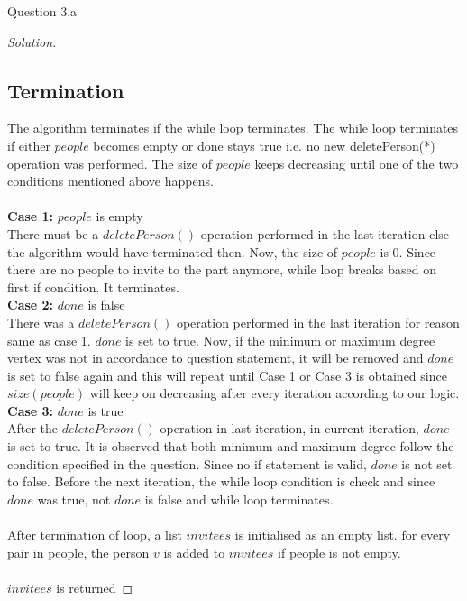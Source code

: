 \begin{solution}{Question 3.a}
\begin{proof}[Solution]
        \subsection*{Termination}
        The algorithm terminates if the while loop terminates. The while loop terminates if either $people$ becomes empty or done stays true i.e. no new deletePerson(*) operation was performed. The size of $people$ keeps decreasing until one of the two conditions mentioned above happens.\\
        \\
        \textbf{Case 1:} $people$ is empty\\
        There must be a $deletePerson()$ operation performed in the last iteration else the algorithm would have terminated then. Now, the size of $people$ is 0. Since there are no people to invite to the part anymore, while loop breaks based on first if condition. It terminates.
        \\
        \textbf{Case 2:} $done$ is false\\
        There was a $deletePerson()$ operation performed in the last iteration for reason same as case 1. $done$ is set to true. Now, if the minimum or maximum degree vertex was not in accordance to question statement, it will be removed and $done$ is set to false again and this will repeat until Case 1 or Case 3 is obtained since $size(people)$ will keep on decreasing after every iteration according to our logic.
        \\
        \textbf{Case 3:} $done$ is true\\
        After the $deletePerson()$ operation in last iteration, in current iteration, $done$ is set to true. It is observed that both minimum and maximum degree follow the condition specified in the question. Since no if statement is valid, $done$ is not set to false. Before the next iteration, the while loop condition is check and since $done$ was true, not $done$ is false and while loop terminates.\\
        \\
        After termination of loop, a list $invitees$ is initialised as an empty list.
        for every pair in people, the person $v$ is added to $invitees$ if people is not empty.\\
        \\
        $invitees$ is returned
        

\end{proof}
\end{solution}
